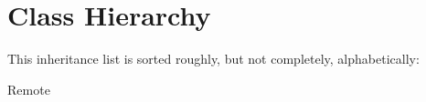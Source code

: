 \section{Class Hierarchy}
This inheritance list is sorted roughly, but not completely, alphabetically\+:\begin{DoxyCompactList}
\item {}
\item Remote\begin{DoxyCompactList}
\item {}
\begin{DoxyCompactList}
\item {}
\end{DoxyCompactList}
\end{DoxyCompactList}
\end{DoxyCompactList}
